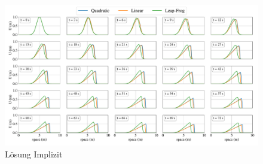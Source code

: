     \begin{figure}
	\centering
	\includegraphics[width=1\textwidth]{papers/burgers/BurgersEquation/imp_paper.pdf}
	\caption{L\"osung Implizit}
	\label{burgers:fig:imp}
	\end{figure}
